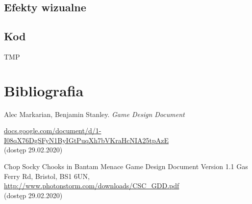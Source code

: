 \documentclass[a4paper,12pt, twoside, titlepage]{article}
\begin{document}
\subsection{Efekty wizualne}
\subsection{Kod}
TMP
\cite{GDD-stanley}


\newpage
\section{Bibliografia}

\begingroup
\renewcommand{\section}[2]{}%
\begin{thebibliography}{}
	Alec Markarian, Benjamin Stanley.
	\emph{Game Design Document}

	\href{https://docs.google.com/document/d/1-I08qX76DgSFyN1ByIGtPuqXh7bVKraHcNIA25tpAzE}{docs.google.com/document/d/1-I08qX76DgSFyN1ByIGtPuqXh7bVKraHcNIA25tpAzE}\\
	(dostęp 29.02.2020)

	Chop Socky Chooks in Bantam Menace Game Design Document Version 1.1 Gas Ferry Rd, Bristol, BS1 6UN, \url{http://www.photonstorm.com/downloads/CSC_GDD.pdf}\\
	(dostęp 29.02.2020)

\end{thebibliography}
\endgroup
\end{document}
